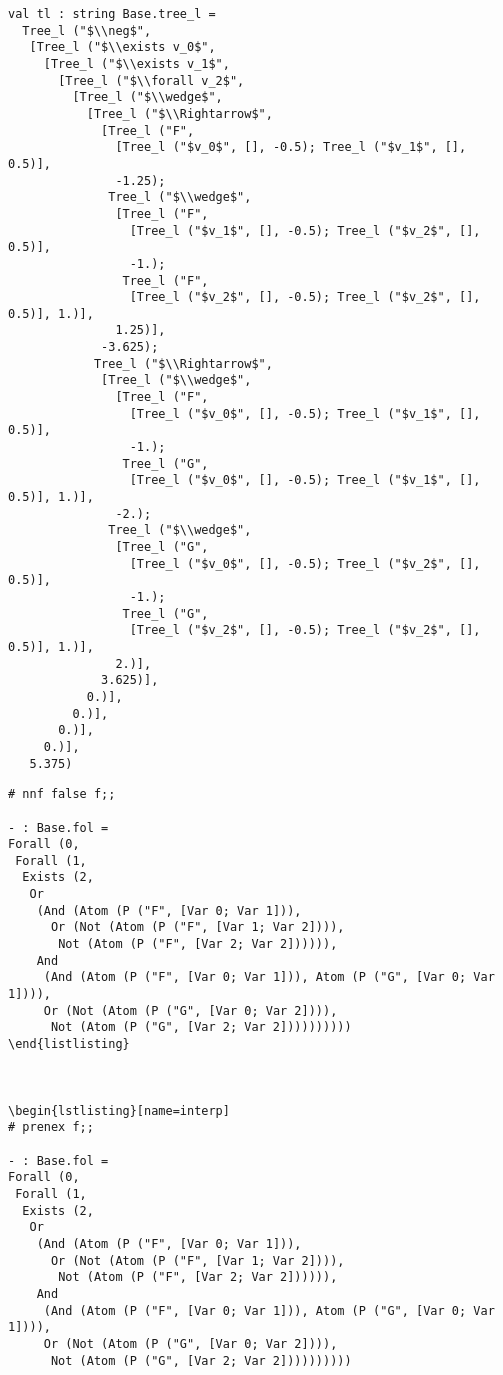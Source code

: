 \documentclass[a4paper]{article}
\begin{document}
\begin{lstlisting}[title=interpréteur, name=interp]
val tl : string Base.tree_l =
  Tree_l ("$\\neg$",
   [Tree_l ("$\\exists v_0$",
     [Tree_l ("$\\exists v_1$",
       [Tree_l ("$\\forall v_2$",
         [Tree_l ("$\\wedge$",
           [Tree_l ("$\\Rightarrow$",
             [Tree_l ("F",
               [Tree_l ("$v_0$", [], -0.5); Tree_l ("$v_1$", [], 0.5)],
               -1.25);
              Tree_l ("$\\wedge$",
               [Tree_l ("F",
                 [Tree_l ("$v_1$", [], -0.5); Tree_l ("$v_2$", [], 0.5)],
                 -1.);
                Tree_l ("F",
                 [Tree_l ("$v_2$", [], -0.5); Tree_l ("$v_2$", [], 0.5)], 1.)],
               1.25)],
             -3.625);
            Tree_l ("$\\Rightarrow$",
             [Tree_l ("$\\wedge$",
               [Tree_l ("F",
                 [Tree_l ("$v_0$", [], -0.5); Tree_l ("$v_1$", [], 0.5)],
                 -1.);
                Tree_l ("G",
                 [Tree_l ("$v_0$", [], -0.5); Tree_l ("$v_1$", [], 0.5)], 1.)],
               -2.);
              Tree_l ("$\\wedge$",
               [Tree_l ("G",
                 [Tree_l ("$v_0$", [], -0.5); Tree_l ("$v_2$", [], 0.5)],
                 -1.);
                Tree_l ("G",
                 [Tree_l ("$v_2$", [], -0.5); Tree_l ("$v_2$", [], 0.5)], 1.)],
               2.)],
             3.625)],
           0.)],
         0.)],
       0.)],
     0.)],
   5.375)
\end{lstlisting}



\begin{lstlisting}[name=interp]
# nnf false f;;

- : Base.fol =
Forall (0,
 Forall (1,
  Exists (2,
   Or
    (And (Atom (P ("F", [Var 0; Var 1])),
      Or (Not (Atom (P ("F", [Var 1; Var 2]))),
       Not (Atom (P ("F", [Var 2; Var 2]))))),
    And
     (And (Atom (P ("F", [Var 0; Var 1])), Atom (P ("G", [Var 0; Var 1]))),
     Or (Not (Atom (P ("G", [Var 0; Var 2]))),
      Not (Atom (P ("G", [Var 2; Var 2])))))))))
\end{listlisting}



\begin{lstlisting}[name=interp]
# prenex f;;

- : Base.fol =
Forall (0,
 Forall (1,
  Exists (2,
   Or
    (And (Atom (P ("F", [Var 0; Var 1])),
      Or (Not (Atom (P ("F", [Var 1; Var 2]))),
       Not (Atom (P ("F", [Var 2; Var 2]))))),
    And
     (And (Atom (P ("F", [Var 0; Var 1])), Atom (P ("G", [Var 0; Var 1]))),
     Or (Not (Atom (P ("G", [Var 0; Var 2]))),
      Not (Atom (P ("G", [Var 2; Var 2])))))))))
\end{lstlisting}
\end{document}

